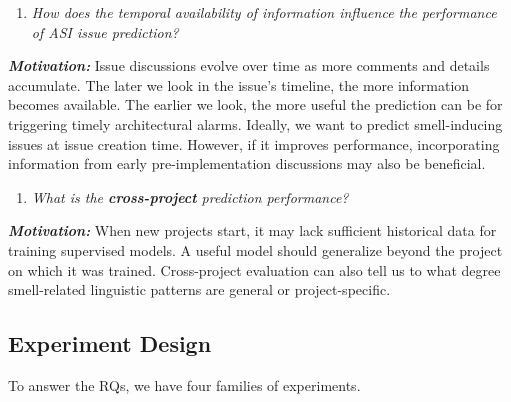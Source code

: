 \begin{enumerate}[leftmargin=*, labelindent=0em, label=\textbf{RQ\arabic*}:, ref=RQ\arabic*, series=researchQuestions, resume]
    \item\label{RQ3 Tempral availiabilty}  \emph{How does the temporal availability of information influence the performance of \ac{ASI} issue prediction?%
          } %
\end{enumerate}
\textbf{\emph{Motivation:} }
Issue discussions evolve over time as more comments and details accumulate.
The later we look in the issue’s timeline, the more information becomes available.
The earlier we look, the more useful the prediction can be for triggering timely architectural alarms.
Ideally, we want to predict smell-inducing issues at issue creation time.
However, if it improves performance, incorporating information from early pre-implementation discussions may also be beneficial.

\begin{enumerate}[leftmargin=*, labelindent=0em, label=\textbf{RQ\arabic*}:, ref=RQ\arabic*, series=researchQuestions, resume]
    \item \label{RQ4 Cross project} \emph{What is the \textbf{cross-project} prediction performance?}
\end{enumerate}
    \textbf{\emph{Motivation:}}
    When new projects start, it may lack sufficient historical data for training supervised models.
    A useful model should generalize beyond the project on which it was trained.
    Cross-project evaluation can also tell us to what degree smell-related linguistic patterns are general or project-specific.


\subsection{Experiment Design}
To answer the RQs, we have four families of experiments.

